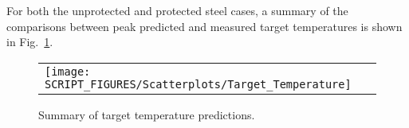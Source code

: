 For both the unprotected and protected steel cases, a summary of the comparisons between peak predicted and measured target temperatures is shown in Fig.~\ref{Surface_Temperature_Steel_Summary}.

\begin{figure}[!ht]
\begin{center}
\begin{tabular}{l}
\texttt{[image: SCRIPT\_FIGURES/Scatterplots/Target\_Temperature]}
\end{tabular}
\end{center}
\caption[Summary of target temperature predictions]
{Summary of target temperature predictions.}
\label{Surface_Temperature_Steel_Summary}
\end{figure}


